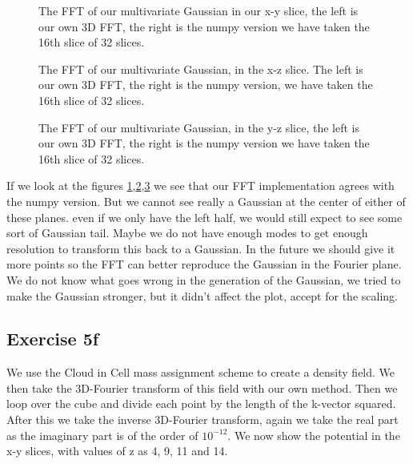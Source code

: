 \begin{figure}
    \centering
    \qquad
    \caption{The FFT of our multivariate Gaussian in our x-y slice, the left is our own 3D FFT, the right is the numpy version we have taken the 16th slice of 32 slices.}
    \label{3dfftxy}
  \end{figure}
  
  \begin{figure}
    \centering
    \qquad
    \caption{The FFT of our multivariate Gaussian, in the x-z slice. The left is our own 3D FFT, the right is the numpy version, we have taken the 16th slice of 32 slices.}
    \label{3dfftxz}
  \end{figure}
  
  \begin{figure}
    \centering
    \qquad
    \caption{The FFT of our multivariate Gaussian, in the y-z slice, the left is our own 3D FFT, the right is the numpy version we have taken the 16th slice of 32 slices.}
    \label{3dfftyz}
  \end{figure}
 If we look at the figures \ref{3dfftxy},\ref{3dfftxz},\ref{3dfftyz} we see that our FFT implementation agrees with the numpy version. But we cannot see really a Gaussian at the center of either of these planes. even if we only have the left half, we would still expect to see some sort of Gaussian tail. Maybe we do not have enough modes to get enough resolution to transform this back to a Gaussian. In the future we should give it more points so the FFT can better reproduce the Gaussian in the Fourier plane. We do not know what goes wrong in the generation of the Gaussian, we tried to make the Gaussian stronger, but it didn't affect the plot, accept for the scaling.

\subsection{Exercise 5f}
We use the Cloud in Cell mass assignment scheme to create a density field. We then take the 3D-Fourier transform of this field with our own method. Then we loop over the cube and divide each point by the length of the k-vector squared. After this we take the inverse 3D-Fourier transform, again we take the real part as the imaginary part is of the order of $10^{-12}$. We now show the potential in the x-y slices, with values of z as 4, 9, 11 and 14.

